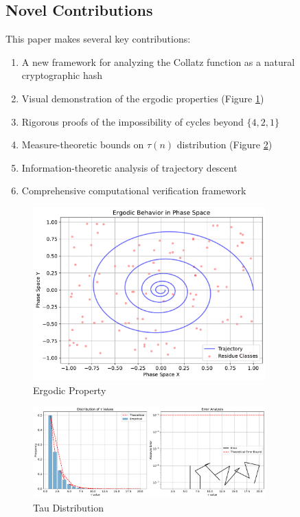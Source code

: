 \subsection{Novel Contributions}
This paper makes several key contributions:
\begin{enumerate}
\item A new framework for analyzing the Collatz function as a natural cryptographic hash
\item Visual demonstration of the ergodic properties (Figure \ref{fig:ergodic_property_intro})
\item Rigorous proofs of the impossibility of cycles beyond $\{4,2,1\}$
\item Measure-theoretic bounds on $\tau(n)$ distribution (Figure \ref{fig:tau_distribution_intro})
\item Information-theoretic analysis of trajectory descent
\item Comprehensive computational verification framework
\end{enumerate}

\begin{figure}[ht]
\centering
\includegraphics[width=0.8\textwidth]{py_visuals/figures/ergodic_property.pdf}
\caption{Ergodic Property}
\label{fig:ergodic_property_intro}
\end{figure}

\begin{figure}[ht]
\centering
\includegraphics[width=0.8\textwidth]{py_visuals/figures/tau_distribution.pdf}
\caption{Tau Distribution}
\label{fig:tau_distribution_intro}
\end{figure}

